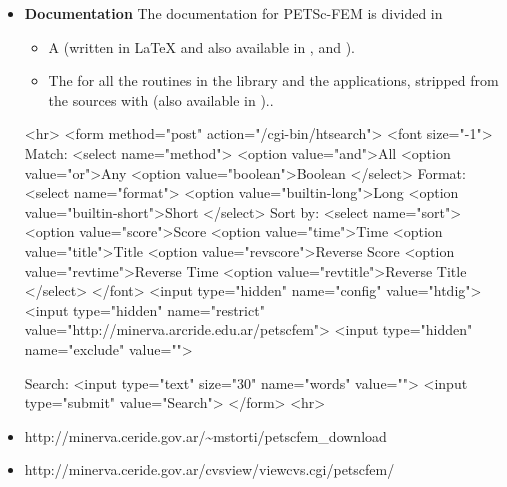 \documentclass[11pt]{article}
\begin{document}
\begin{itemize}
\item \textbf{Documentation}
The documentation for PETSc-FEM is divided in 

\begin{itemize}
\item A 
(written in \LaTeX{} and also available in
, and ).

\item The  for all the routines in the
library and the applications, stripped from the sources with
(also available in )..
\end{itemize}

\begin{rawhtml}
<hr>
<form method="post" action="/cgi-bin/htsearch">
<font size="-1">
Match: <select name="method">
<option value="and">All
<option value="or">Any
<option value="boolean">Boolean
</select>
Format: <select name="format">
<option value="builtin-long">Long
<option value="builtin-short">Short
</select>
Sort by: <select name="sort">
<option value="score">Score
<option value="time">Time
<option value="title">Title
<option value="revscore">Reverse Score
<option value="revtime">Reverse Time
<option value="revtitle">Reverse Title
</select>
</font>
<input type="hidden" name="config" value="htdig">
<input type="hidden" name="restrict" value="http://minerva.arcride.edu.ar/petscfem">
<input type="hidden" name="exclude" value="">

Search:
<input type="text" size="30" name="words" value="">
<input type="submit" value="Search">
</form>
<hr>
\end{rawhtml}

\item {}
                {http://minerva.ceride.gov.ar/\~{}mstorti/petscfem_download}
\item {}
                {http://minerva.ceride.gov.ar/cvsview/viewcvs.cgi/petscfem/} 

\end{itemize}
\end{document}
